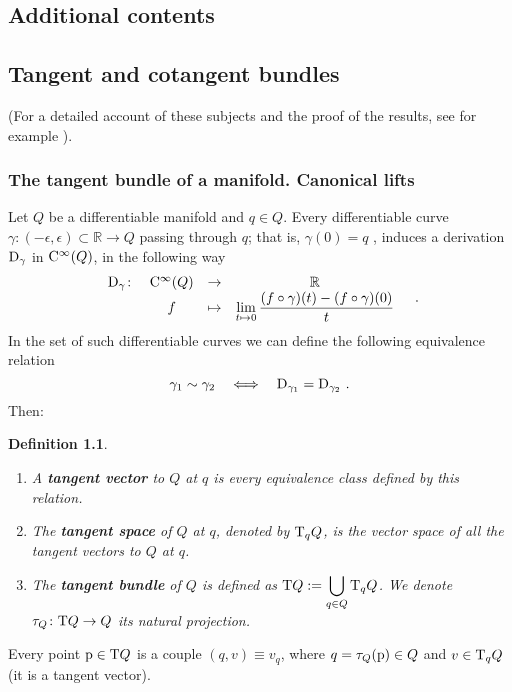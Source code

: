 \documentclass[12pt]{report}
\newtheorem{definition}[teor]{Definition}
\def\ben{\begin{enumerate}}
\def\een{\end{enumerate}}
\def\dst{\displaystyle}
\def\Real{\mathbb{R}}
\def\Tan{{\rm T}}
\def\Cinfty{{\rm C}^\infty}
\begin{document}
\begin{appendix}
\chapter{Additional contents}

\section{Tangent and cotangent bundles}
\label{sec:tangentb}

(For a detailed account of these subjects and the proof of the results, see for example 
\cite{Con2001,KN-96,Lee2013,PmQ-69,St-64}).


\subsection{The tangent bundle of a manifold. Canonical lifts}
\label{canliftq}

Let $Q$ be a differentiable manifold and  $q\in Q$.
Every differentiable curve
$\gamma\colon (-\epsilon ,\epsilon )\subset \Real \to Q$
passing through $q$; that is, 
$\gamma (0)=q$ ,
induces a derivation ${\rm D}_\gamma$ in $\Cinfty (Q)$,
in the following way
$$
\begin{array}{cccc}
{\rm D}_\gamma \colon & \Cinfty (Q) & \to & \Real
\\
& f & \mapsto &\displaystyle \lim_{t \mapsto 0}\frac{(f\circ\gamma )(t)-(f\circ\gamma )(0)}{t}
\end{array} \quad .
$$
In the set of such differentiable curves we can define the following equivalence relation
$$
\gamma_1 \sim \gamma_2 \quad \Longleftrightarrow
\quad
{\rm D}_{\gamma_1}={\rm D}_{\gamma_2} \ .
$$
Then:
\begin{definition}
\ben
\item
A \textbf{tangent vector} to $Q$ at $q$
is every equivalence class defined  by this relation.
\item
The \textbf{tangent space} of $Q$ at $q$,
denoted by $\Tan_qQ$, is the vector space of all the tangent vectors
to $Q$ at $q$.
\item
The \textbf{tangent bundle} of $Q$ is defined as
 \(\dst \Tan Q := \bigcup_{q \in Q}\Tan_qQ\).
We denote $\tau_Q \colon \Tan Q \to Q$ its natural projection.
\een
\end{definition}

Every point ${\rm p}\in\Tan Q$ is a couple
$(q,v)\equiv v_q$, where $q=\tau_Q({\rm p})\in Q$
and $v\in\Tan_qQ$ (it is a tangent vector).


\end{appendix}
\end{document}
